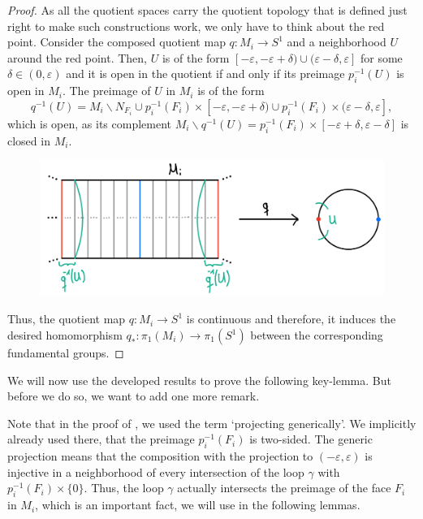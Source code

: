 \begin{proof}
    \noindent
    As all the quotient spaces carry the quotient topology that is defined just right to make such constructions work, we only have to think about the red point.
    Consider the composed quotient map \(q : M_i \to S^1\) and a neighborhood \(U\) around the red point.
    Then, \(U\) is of the form \([-\varepsilon, -\varepsilon + \delta) \cup (\varepsilon - \delta, \varepsilon]\) for some \(\delta \in (0, \varepsilon)\) and it is open in the quotient if and only if its preimage \(p_i^{-1}(U)\) is open in \(M_i\).
    The preimage of \(U\) in \(M_i\) is of the form
    \[q^{-1}(U) = M_i \backslash N_{F_i} \cup p_i^{-1}(F_i) \times [-\varepsilon, -\varepsilon + \delta) \cup p_i^{-1}(F_i) \times (\varepsilon - \delta, \varepsilon],\]
    which is open, as its complement \(M_i \backslash q^{-1}(U) = p_i^{-1}(F_i) \times [-\varepsilon + \delta, \varepsilon - \delta]\) is closed in \(M_i\).
    \begin{figure}[h!]
        \label{img:quotientnbhd}
        \centering
        \includegraphics[width=.5\textwidth]{gfx/Quotient neighborhood .png}
    \end{figure}\vspace*{-2\parskip}

    \noindent
    Thus, the quotient map \(q : M_i \to S^1\) is continuous and therefore, it induces the desired homomorphism \(q_* : \pi_1(M_i) \to \pi_1(S^1)\) between the corresponding fundamental groups.
\end{proof}

We will now use the developed results to prove the following key-lemma.
But before we do so, we want to add one more remark.

\begin{remark}
    Note that in the proof of , we used the term `projecting generically'.
    We implicitly already used there, that the preimage \(p_i^{-1}(F_i)\) is two-sided.
    The generic projection means that the composition with the projection to \((-\varepsilon, \varepsilon)\) is injective in a neighborhood of every intersection of the loop \(\gamma\) with \(p_i^{-1}(F_i) \times \{0\}\).
    Thus, the loop \(\gamma\) actually intersects the preimage of the face \(F_i\) in \(M_i\), which is an important fact, we will use in the following lemmas.
\end{remark}

